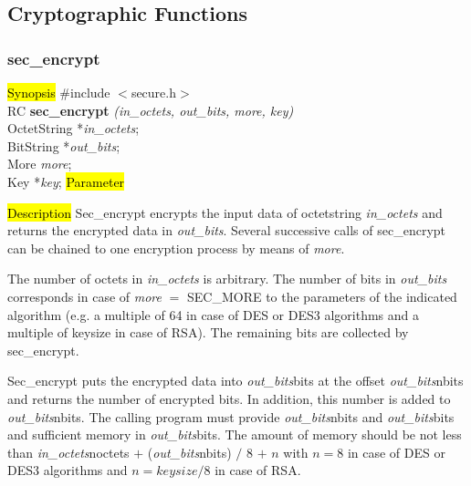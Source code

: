 \subsection{Cryptographic Functions}
\subsubsection{sec\_encrypt}
\label{sec_encrypt}
\hl{Synopsis}
\#include $<$secure.h$>$ \\ [0.5cm]
RC {\bf sec\_encrypt} {\em (in\_octets, out\_bits, more, key)} \\
OctetString *{\em in\_octets}; \\
BitString *{\em out\_bits}; \\
More {\em more}; \\
Key *{\em key};
\hl{Parameter}




\hl{Description}
Sec\_encrypt encrypts the input data of octetstring {\em in\_octets} and returns the encrypted data
in {\em out\_bits}. Several successive calls of sec\_encrypt can be chained
to one encryption process by means of {\em more}.
          
The number of octets in {\em in\_octets} is arbitrary. The number of bits in {\em out\_bits}
corresponds in case of {\em more} $=$ SEC\_MORE to the parameters of the indicated algorithm
(e.g. a multiple of 64 in case of DES or DES3 algorithms and a multiple of keysize
in case of RSA). The remaining bits are collected by sec\_encrypt.

Sec\_encrypt puts the encrypted data into {\em out\_bits}\pf bits at the offset
{\em out\_bits}\pf nbits and returns the number of encrypted bits. In addition, this number is added 
to {\em out\_bits}\pf nbits.
The calling program must provide {\em out\_bits}\pf nbits and {\em out\_bits}\pf bits and sufficient
memory in {\em out\_bits}\pf bits. 
The amount of memory should be not less than
{\em in\_octets}\pf noctets $+$ ({\em out\_bits}\pf nbits) $/$ 8 $+$ $n$ with $n = 8$ 
in case of DES or DES3 algorithms and $n = keysize / 8$ in case of RSA.


